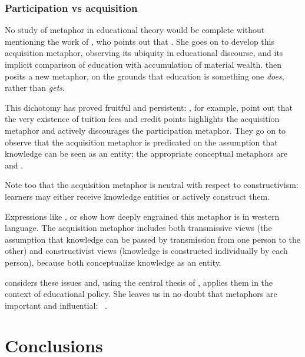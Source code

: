 \subsubsection*{Participation vs acquisition}

No study of metaphor in educational theory would be complete without
mentioning the work of , who points out that
.  She goes on to develop this acquisition
metaphor, observing its ubiquity in educational discourse, and its
implicit comparison of education with accumulation of material wealth.
\citeauthor{sfard1998} then posits a new 
metaphor, on the grounds that education is something one {\em does},
rather than {\em gets}.

This dichotomy has proved fruitful and persistent: ,
for example, point out that the very existence of tuition fees and
credit points highlights the acquisition metaphor and actively
discourages the participation metaphor.  They go on to observe that
the acquisition metaphor is predicated on the assumption that
knowledge can be seen as an entity; the appropriate conceptual
metaphors are  and .

Note too that the acquisition metaphor is neutral with respect to
constructivism: learners may either receive knowledge entities or
actively construct them.

Expressions like ,
 or
 show how deeply engrained this
metaphor is in western language.  The acquisition metaphor includes
both transmissive views (the assumption that knowledge can be passed
by transmission from one person to the other) and constructivist views
(knowledge is constructed individually by each person), because both
conceptualize knowledge as an entity.

 considers these issues and, using the central
thesis of , applies them in the context of
educational policy.  She leaves us in no doubt that metaphors are
important and influential: ~\parencite[page 5]{sfard1998}.

\section{Conclusions}

